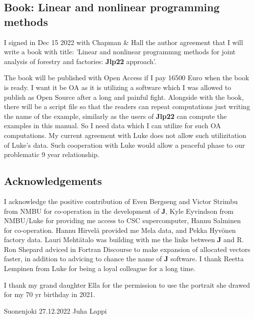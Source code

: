  
\subsection*{Book: Linear and nonlinear programming methods} 
I signed in Dec 15 2022 with Chapman \& Hall the author agreement that I will write 
a book with title: 'Linear and nonlinear programmng methods for joint analysis of forestry 
and factories: \textbf{Jlp22} approach'. 
 
The book will be published with Open Access if I pay 16500 Euro when the book is ready. 
I want it be OA as it is utilizing a software which I was allowed to publish as Open Source after a long 
and painful fight. Alongside with the book, there will be a script file so that the readers 
can repeat computations just writing the name of the example, similarly as the users 
of \textbf{Jlp22} can compute the examples in this manual. So I need data which I can utilize for such OA 
computations. My current agreement with Luke does not allow such utilizitation of Luke's data. 
Such cooperation with Luke 
would allow a peaceful phase to our problematic 9 year relationship. 
 
 
 
\subsection*{Acknowledgements} 
 
 
 
I acknowledge the positive contribution of 
Even Bergseng and Victor Strimbu from NMBU for co-operation in the development of \textbf{J}, Kyle Eyvindson from NMBU/Luke for 
providing me access to CSC supercomputer, Hannu Salminen for co-operation. 
Hannu Hirvel\"a  provided me Mela data, and Pekka Hyv\"onen factory data. 
Lauri Meht\"atalo was building with me the links between \textbf{J} and R. 
Ron Shepard adviced in Fortran Discourse to make expansion of allocated 
vectors faster, in addition to advicing to chance the name of \textbf{J} software. 
I thank Reetta Lempinen from Luke for being a loyal colleague for a long time. 
 
 
I thank my grand daughter Ella 
for the permission to use the portrait she drawed for my 70 yr birthday in 2021. 
 
\vspace{0.5cm} 
Suonenjoki 27.12.2022 
\vspace{0.5cm} 
Juha Lappi 
 
